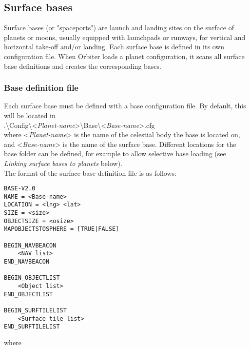 \documentclass[Orbiter Developer Manual.tex]{subfiles}
\begin{document}
\subsection{Surface bases}
\label{ssec:surface_bases}
Surface bases (or "spaceports") are launch and landing sites on the surface of planets or moons, usually equipped with launchpads or runways, for vertical and horizontal take-off and/or landing. Each surface base is defined in its own configuration file. When Orbiter loads a planet configuration, it scans all surface base definitions and creates the corresponding bases.

\subsubsection*{Base definition file}
Each surface base must be defined with a base configuration file. By default, this will be located in\\
\indent .\textbackslash Config\textbackslash <\textit{Planet-name}>\textbackslash Base\textbackslash <\textit{Base-name}>.cfg\\
where <\textit{Planet-name}> is the name of the celestial body the base is located on, and <\textit{Base-name}> is the name of the surface base. Different locations for the base folder can be defined, for example to allow selective base loading (see \textit{Linking surface bases to planets} below).\\
The format of the surface base definition file is as follows:

\begin{lstlisting}[language=OSFS]
BASE-V2.0
NAME = <Base-name>
LOCATION = <lng> <lat>
SIZE = <size>
OBJECTSIZE = <osize>
MAPOBJECTSTOSPHERE = [TRUE|FALSE]

BEGIN_NAVBEACON
	<NAV list>
END_NAVBEACON

BEGIN_OBJECTLIST
	<Object list>
END_OBJECTLIST

BEGIN_SURFTILELIST
	<Surface tile list>
END_SURFTILELIST
\end{lstlisting}

\noindent
where
\end{document}
